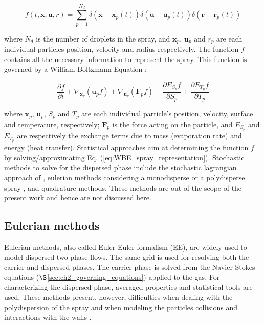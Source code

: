 \begin{equation}
\label{eq:f_spray_description_subramanian}
f \left( t, \textbf{x}, \textbf{u}, r \right) = \sum_{p=1}^{N_d} \delta \left( \textbf{x} - \textbf{x}_p \left( t \right) \right)  \delta \left( \textbf{u} - \textbf{u}_p \left( t \right) \right) \delta \left( \textbf{r} - \textbf{r}_p \left( t \right) \right)
\end{equation}

where $N_d$ is the number of droplets in the spray, and $\textbf{x}_p$, $\textbf{u}_p$ and $r_p$ are each individual particles position, velocity and radius respectively. The function $f$ contains all the necessary information to represent the spray. This function is governed by a William-Boltzmann Equation :

\begin{equation}
\label{eq:WBE_spray_representation}
\frac{\partial f}{\partial t} + \nabla_{\textbf{x}_p} \left( \textbf{u}_p f \right) + \nabla_{\textbf{u}_p} \left( \textbf{F}_p f \right) + \frac{\partial E_{S_p} f}{\partial S_p} + \frac{\partial E_{T_p} f}{\partial T_p}
\end{equation}

where $\textbf{x}_p$, $\textbf{u}_p$, $S_p$ and $T_p$ are each individual particle's position, velocity, surface and temperature, respectively; $\textbf{F}_p$ is the force acting on the particle, and $E_{S_p}$ and $E_{T_p}$ are respectively the exchange terms due to mass (evaporation rate) and energy (heat transfer). Statistical approaches aim at determining the function $f$ by solving/approximating Eq. (\ref{eq:WBE_spray_representation}). Stochastic methods to solve for the dispersed phase include the stochastic lagrangian approach of , eulerian methods considering a monodisperse  or a polydisperse spray , and quadrature methods. These methods are out of the scope of the present work and hence are not discussed here.



\subsection{Eulerian methods}

Eulerian methods, also called Euler-Euler formalism (EE), are widely used to model dispersed two-phase flows. The same grid is used for resolving both the carrier and dispersed phases. The carrier phase is solved from the Navier-Stokes equations ($\S$\ref{sec:ch2_governing_equations}) applied to the gas. For characterizing the dispersed phase, averaged properties and statistical tools are used. These methods present, however, difficulties when dealing with the polydispersion of the spray and when modeling the particles collisions and interactions with the walls .

